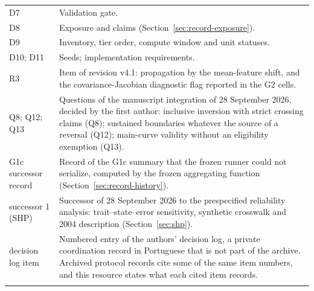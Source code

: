 \begin{table}[htbp]
\begin{tabular}{@{}>{\raggedright\arraybackslash}p{}>{\raggedright\arraybackslash}p{}@{}}
D7 & Validation gate. \\
D8 & Exposure and claims (Section~\ref{sec:record-exposure}). \\
D9 & Inventory, tier order, compute window and unit statuses. \\
D10; D11 & Seeds; implementation requirements. \\
R3 & Item of revision v4.1: propagation by the mean-feature shift, and the covariance-Jacobian diagnostic flag reported in the G2 cells. \\
Q8; Q12; Q13 & Questions of the manuscript integration of 28 September 2026, decided by the first author: inclusive inversion with strict crossing claims (Q8); sustained boundaries whatever the source of a reversal (Q12); main-curve validity without an eligibility exemption (Q13). \\
G1c successor record & Record of the G1c summary that the frozen runner could not serialize, computed by the frozen aggregating function (Section~\ref{sec:record-history}). \\
successor 1 (SHP) & Successor of 28 September 2026 to the prespecified reliability analysis: trait--state--error sensitivity, synthetic crosswalk and 2004 description (Section~\ref{sec:shp}). \\
decision log item & Numbered entry of the authors' decision log, a private coordination record in Portuguese that is not part of the archive. Archived protocol records cite some of the same item numbers, and this resource states what each cited item records. \\
\botrule
\end{tabular}
\end{table}

